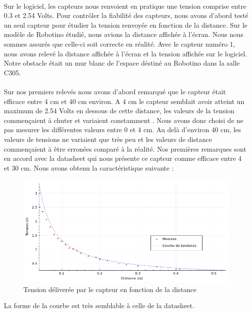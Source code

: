\documentclass[oneside,a4paper,12pt]{article}
\begin{document}
	\paragraph{}
	Sur le logiciel, les capteurs nous renvoient en pratique une tension comprise entre 0.3 et 2.54 Volts. Pour contrôler la fiabilité des capteurs, nous avons d’abord testé un seul capteur pour étudier la tension renvoyée en fonction de la distance. Sur le modèle de Robotino étudié, nous avions la distance affichée à l’écran. Nous nous sommes assurés que celle-ci soit correcte en réalité. Avec le capteur numéro 1, nous avons relevé la distance affichée à l’écran et la tension affichée sur le logiciel. Notre obstacle était un mur blanc de l’espace déstiné au Robotino dans la salle C305.\\
	\paragraph{}
	Sur nos premiers relevés nous avons d’abord remarqué que le capteur était efficace entre 4 cm et 40 cm environ. A 4 cm le capteur semblait avoir atteint un maximum de 2.54 Volts en dessous de cette distance, les valeurs de la tension commençaient à chuter et variaient constamment . Nous avons donc choisi de ne pas mesurer les différentes valeurs entre 0 et  4 cm.  Au delà d'environ 40 cm, les valeurs de tensions ne variaient que très peu et les valeurs de distance commençaient à être erronées comparé à la réalité. Nos premières remarques sont en accord avec la datasheet qui nous présente ce capteur comme efficace entre 4 et 30 cm.
	Nous avons obtenu la caractéristique suivante : \\
	
	\begin{figure}[h]
		\centering
		\includegraphics[width=12cm]{mesures.png}
		\caption{Tension déliverée par le capteur en fonction de la distance}
	\end{figure}
	\newpage
	La forme de la courbe est très semblable à celle de la datasheet. 
	
\end{document}
